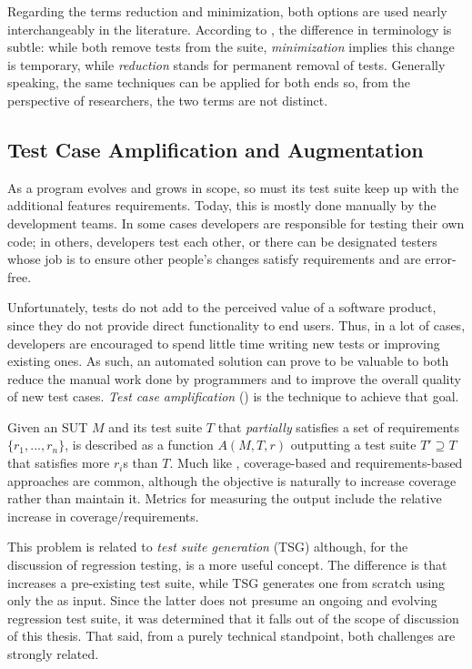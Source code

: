 Regarding the terms reduction and minimization, both options are used nearly interchangeably in the literature.
According to \citeauthor{yoo2012regression}, the difference in terminology is subtle: while both remove tests from the suite, \textit{minimization} implies this change is temporary, while \textit{reduction} stands for permanent removal of tests.
Generally speaking, the same techniques can be applied for both ends so, from the perspective of researchers, the two terms are not distinct.

\subsection{Test Case Amplification and Augmentation}
\label{sec:tsa}

As a program evolves and grows in scope, so must its test suite keep up with the additional features requirements.
Today, this is mostly done manually by the development teams.
In some cases developers are responsible for testing their own code; in others, developers test each other, or there can be designated testers whose job is to ensure other people's changes satisfy requirements and are error-free.

Unfortunately, tests do not add to the perceived value of a software product, since they do not provide direct functionality to end users.
Thus, in a lot of cases, developers are encouraged to spend little time writing new tests or improving existing ones.
As such, an automated solution can prove to be valuable to both reduce the manual work done by programmers and to improve the overall quality of new test cases.
\textit{Test case amplification} (\tsa) is the technique to achieve that goal.

Given an SUT $M$ and its test suite $T$ that \textit{partially} satisfies a set of requirements $\{r_1, ..., r_n\}$, \tsa is described as a function $A(M, T, r)$ outputting a test suite $T' \supseteq T$ that satisfies more $r_i$s than $T$.
Much like \tsr, coverage-based and requirements-based approaches are common, although the objective is naturally to increase coverage rather than maintain it.
Metrics for measuring the output include the relative increase in coverage/requirements.

This problem is related to \textit{test suite generation} (TSG) although, for the discussion of regression testing, \tsa is a more useful concept.
The difference is that \tsa increases a pre-existing test suite, while TSG generates one from scratch using only the \sut as input.
Since the latter does not presume an ongoing and evolving regression test suite, it was determined that it falls out of the scope of discussion of this thesis.
That said, from a purely technical standpoint, both challenges are strongly related.

